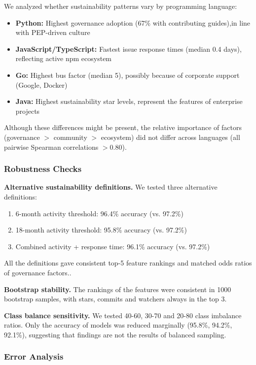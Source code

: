 \documentclass[conference]{IEEEtran}
\begin{document}
We analyzed whether sustainability patterns vary by programming language:

\begin{itemize}
    \item \textbf{Python:} Highest governance adoption (67\% with contributing guides),in line with PEP-driven culture
    \item \textbf{JavaScript/TypeScript:} Fastest issue response times (median 0.4 days), reflecting active npm ecosystem
    \item \textbf{Go:} Highest bus factor (median 5), possibly because of corporate support  (Google, Docker)
    \item \textbf{Java:} Highest sustainability star levels, represent the features of enterprise projects
\end{itemize}

Although these differences might be present, the relative importance of factors (governance $>$ community $>$ ecosystem) did not differ  across languages (all pairwise Spearman correlations $> 0.80$).

\subsubsection{Robustness Checks}

\textbf{Alternative sustainability definitions.} We tested three alternative definitions:
\begin{enumerate}
    \item 6-month activity threshold: 96.4\% accuracy (vs. 97.2\%)
    \item 18-month activity threshold: 95.8\% accuracy (vs. 97.2\%)
    \item Combined activity + response time: 96.1\% accuracy (vs. 97.2\%)
\end{enumerate}

All the definitions gave consistent top-5 feature rankings and matched odds ratios of governance factors..

\textbf{Bootstrap stability.} The rankings of the features were consistent in 1000 bootstrap samples, with stars, commits and watchers always in the top 3.

\textbf{Class balance sensitivity.} We tested 40-60, 30-70 and 20-80 class imbalance ratios. Only the accuracy of models was reduced marginally (95.8\%, 94.2\%, 92.1\%), suggesting that findings are not the results of balanced sampling.

\subsubsection{Error Analysis}
\end{document}
